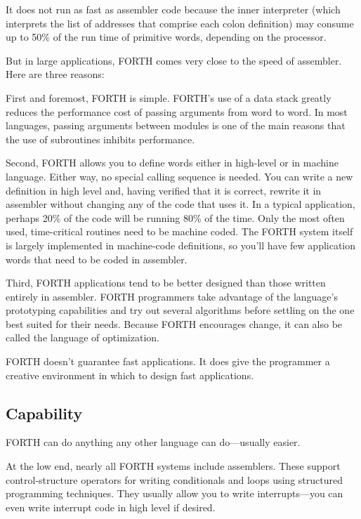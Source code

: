 It does not run as fast as assembler code because the inner interpreter
(which interprets the list of addresses that comprise each colon definition)
may consume up to 50\% of the run time of primitive words, depending
on the processor.

But in large applications, FORTH comes very close to the speed of
assembler. Here are three reasons:

First and foremost, FORTH is simple. FORTH's use of a data stack greatly
reduces the performance cost of passing arguments from word to word.
In most languages, passing arguments between modules is one of the
main reasons that the use of subroutines inhibits performance.

Second, FORTH allows you to define words either in high-level or in
machine language. Either way, no special calling sequence is needed.
You can write a new definition in high level and, having verified
that it is correct, rewrite it in assembler without changing any of
the code that uses it. In a typical application, perhaps 20\% of the
code will be running 80\% of the time. Only the most often used, time-critical
routines need to be machine coded. The FORTH system itself is largely
implemented in machine-code definitions, so you'll have few application
words that need to be coded in assembler.


Third, FORTH applications tend to be better designed than those written
entirely in assembler. FORTH programmers take advantage of the language's
prototyping capabilities and try out several algorithms before settling
on the one best suited for their needs. Because FORTH encourages change,
it can also be called the language of optimization.

FORTH doesn't guarantee fast applications. It does give the programmer
a creative environment in which to design fast applications.


\subsection{Capability}
FORTH can do anything any other language can do---usually easier.

At the low end, nearly all FORTH systems include assemblers. These
support control-structure operators for writing conditionals and loops
using structured programming techniques. They usually allow you to
write interrupts---you can even write interrupt code in high level
if desired.

